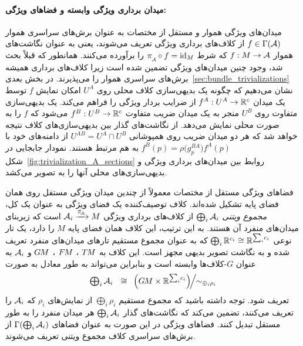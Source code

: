 \paragraph{میدان برداری ویژگی وابسته و فضاهای ویژگی:}
میدان‌های ویژگی هموار و مستقل از مختصات به عنوان برش‌های سراسری هموار $f\in\Gamma(\mathcal{A})$ از کلاف‌های برداری ویژگی تعریف می‌شوند، یعنی به عنوان نگاشت‌های هموار $f:M\to\mathcal{A}$ که شرط $\piA\circ f=\id_M$ را برآورده می‌کنند.
همانطور که قبلاً بحث شد، وجود چنین میدان‌های ویژگی تضمین شده است زیرا کلاف‌های برداری همیشه برش‌های سراسری هموار را می‌پذیرند.
در بخش بعدی~\ref{sec:bundle_trivializations} نشان می‌دهیم که چگونه یک بدیهی‌سازی کلاف محلی روی $U^A$ امکان نمایش $f$ توسط یک میدان $f^A:U^A\to\mathbb{R}^c$ از ضرایب بردار ویژگی را فراهم می‌کند.
یک بدیهی‌سازی متفاوت روی $U^B$ منجر به یک میدان ضریب متفاوت $f^B:U^B\to\mathbb{R}^c$ می‌شود که $f$ را به صورت محلی نمایش می‌دهد.
از نگاشت‌های گذار بین بدیهی‌سازی‌های کلاف نتیجه خواهد شد که هر دو میدان ضریب روی همپوشانی $U^{AB}=U^A\cap U^B$ از دامنه‌های خود با $f^B(p)=\rho\big(g_p^{BA}\big) f^A(p)$ به هم مرتبط هستند.
نمودار جابجایی در شکل~\ref{fig:trivialization_A_sections} روابط بین میدان‌های برداری ویژگی و بدیهی‌سازی‌های محلی آنها را به تصویر می‌کشد.


فضاهای ویژگی  مستقل از مختصات معمولاً از چندین میدان ویژگی مستقل روی همان فضای پایه تشکیل شده‌اند.
کلاف توصیف‌کننده یک فضای ویژگی به عنوان یک کل، \emph{مجموع ویتنی} $\bigoplus_i\mathcal{A}_i$ از کلاف‌های برداری ویژگی $\A_i\xrightarrow{\scalebox{.85}{$\pi_{\scalebox{.6}{$\!\A_i$}}$}}M$ است که زیربنای میدان‌های منفرد آن هستند.
به این ترتیب، این کلاف همان فضای پایه $M$ را دارد، یک تار نوعی $\bigoplus_i\mathbb{R}^{c_i} \cong \mathbb{R}^{\sum_i\!c_i}$ که به عنوان مجموع مستقیم تارهای میدان‌های منفرد تعریف شده و به نگاشت تصویر بدیهی مجهز است.
این کلاف به $T\mkern-1.5muM$ ، $F\mkern-1.5muM$ ، $G\mkern-1.4muM$ و $\mathcal{A}_i$ به عنوان $G$-کلاف‌ها وابسته است و بنابراین می‌تواند به طور معادل به صورت
\begin{align}
	\scalebox{1.1}{$\bigoplus$}_i\,\A_i\ \ \cong\,\ \left(\GM\times\R^{\sum_i\!c_i}\right)\!\!\Big/\!\!\sim_{\oplus_i\rho_i}
\end{align}
تعریف شود.
توجه داشته باشید که مجموع مستقیم $\bigoplus_i\rho_i$ از نمایش‌های $\rho_i$ که $\mathcal{A}_i$ را تعریف می‌کنند، تضمین می‌کند که نگاشت‌های گذار $\bigoplus_i\mathcal{A}_i$ هر میدان منفرد را به طور مستقل تبدیل کنند.
فضاهای ویژگی در این صورت به عنوان فضاهای $\Gamma\!\left(\bigoplus_i\mathcal{A}_i\right)$ از برش‌های سراسری کلاف مجموع ویتنی تعریف می‌شوند.